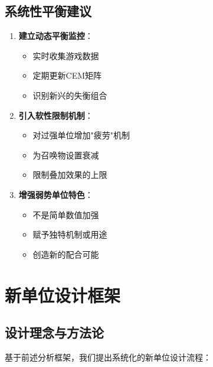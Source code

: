 \documentclass[a4paper,12pt]{article}
\begin{document}
\subsection{系统性平衡建议}

\begin{enumerate}
\item \textbf{建立动态平衡监控}：
   \begin{itemize}
   \item 实时收集游戏数据
   \item 定期更新CEM矩阵
   \item 识别新兴的失衡组合
   \end{itemize}

\item \textbf{引入软性限制机制}：
   \begin{itemize}
   \item 对过强单位增加"疲劳"机制
   \item 为召唤物设置衰减
   \item 限制叠加效果的上限
   \end{itemize}

\item \textbf{增强弱势单位特色}：
   \begin{itemize}
   \item 不是简单数值加强
   \item 赋予独特机制或用途
   \item 创造新的配合可能
   \end{itemize}
\end{enumerate}

\section{新单位设计框架}

\subsection{设计理念与方法论}
基于前述分析框架，我们提出系统化的新单位设计流程：
\end{document}

